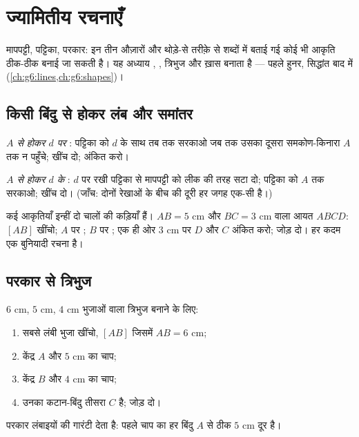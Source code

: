\chapter{ज्यामितीय रचनाएँ}\label{ch:g5:geometry}

मापपट्टी,  पट्टिका, परकार: इन तीन औज़ारों और थोड़े-से
तरीक़े से शब्दों में बताई गई कोई भी आकृति ठीक-ठीक बनाई जा सकती
है। यह अध्याय , , त्रिभुज और ख़ास 
बनाता है --- पहले हुनर, सिद्धांत बाद में
(\cref{ch:g6:lines,ch:g6:shapes})।

\section{किसी बिंदु से होकर लंब और समांतर}

\begin{method}[दो बुनियादी रचनाएँ]\label{met:g5:geometry:basic}
\emph{$A$ से होकर $d$ पर }:  पट्टिका को $d$ के साथ तब तक
सरकाओ जब तक उसका दूसरा समकोण-किनारा $A$ तक न पहुँचे; खींच दो;
 अंकित करो।

\emph{$A$ से होकर $d$ के }: $d$ पर रखी  पट्टिका से
मापपट्टी को लीक की तरह सटा दो; पट्टिका को $A$ तक सरकाओ;
खींच दो। (जाँच: दोनों रेखाओं के बीच की दूरी हर जगह एक-सी
है।)
\end{method}

\begin{example}[रचनाओं की कड़ी]\label{ex:g5:geometry:chain}
कई आकृतियाँ इन्हीं दो चालों की कड़ियाँ हैं। $AB = 5$ cm और
$BC = 3$ cm वाला आयत $ABCD$: $[AB]$ खींचो; $A$ पर ;
$B$ पर ; एक ही ओर $3$ cm पर $D$ और $C$ अंकित करो;
जोड़ दो। हर कदम एक बुनियादी रचना है।
\end{example}

\section{परकार से त्रिभुज}

\begin{method}[तीन भुजाओं से त्रिभुज]\label{met:g5:geometry:triangle}
$6$ cm, $5$ cm, $4$ cm भुजाओं वाला त्रिभुज बनाने के लिए:
\begin{enumerate}
  \item सबसे लंबी भुजा खींचो, $[AB]$ जिसमें $AB = 6$ cm;
  \item केंद्र $A$ और  $5$ cm का चाप;
  \item केंद्र $B$ और  $4$ cm का चाप;
  \item उनका कटान-बिंदु तीसरा  $C$ है; जोड़ दो।
\end{enumerate}
परकार लंबाइयों की गारंटी देता है: पहले चाप का हर बिंदु $A$ से
ठीक $5$ cm दूर है।
\end{method}

